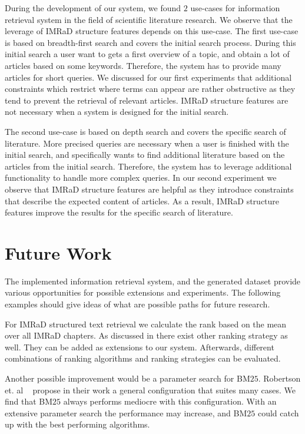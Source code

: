 During the development of our system, we found $2$ use-cases for information retrieval system in the field of scientific literature research. We observe that the leverage of IMRaD structure features depends on this use-case. The first use-case is based on breadth-first search and covers the initial search process. During this initial search a user want to gets a first overview of a topic, and obtain a lot of articles based on some keywords. Therefore, the system has to provide many articles for short queries. We discussed for our first experiments that additional constraints which restrict where terms can appear are rather obstructive as they tend to prevent the retrieval of relevant articles. IMRaD structure features are not necessary when a system is designed for the initial search.

The second use-case is based on depth search and covers the specific search of literature. More precised queries are necessary when a user is finished with the initial search, and specifically wants to find additional literature based on the articles from the initial search. Therefore, the system has to leverage additional functionality to handle more complex queries. In our second experiment we observe that IMRaD structure features are helpful as they introduce constraints that describe the expected content of articles. As a result, IMRaD structure features improve the results for the specific search of literature.

\section{Future Work}
\label{sec:future_work}

The implemented information retrieval system, and the generated dataset provide various opportunities for possible extensions and experiments. The following examples should give ideas of what are possible paths for future research.

For IMRaD structured text retrieval we calculate the rank based on the mean over all IMRaD chapters. As discussed in  there exist other ranking strategy as well. They can be added as extensions to our system. Afterwards, different combinations of ranking algorithms and ranking strategies can be evaluated. 

Another possible improvement would be a parameter search for BM$25$. Robertson et. al ~\cite{RobertsonWJHG94} propose in their work a general configuration that suites many cases. We find that BM$25$ always performs mediocre with this configuration. With an extensive parameter search the performance may increase, and BM$25$ could catch up with the best performing algorithms.

